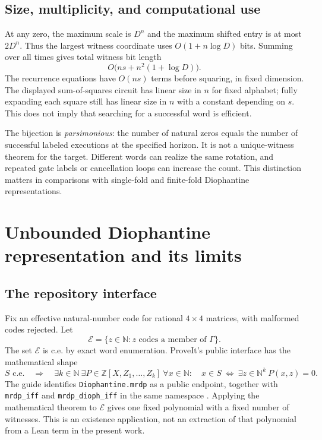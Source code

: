 \documentclass[11pt,letterpaper]{article}
\numberwithin{equation}{section}
\theoremstyle{definition}
\theoremstyle{remark}
\newcommand{\N}{\mathbb N}
\newcommand{\Z}{\mathbb Z}
\newcommand{\code}[1]{\nolinkurl{#1}}
\newcommand{\srcmark}[1]{\par\noindent{\small\itshape [source~#1]}\par}
\begin{document}
\subsection{Size, multiplicity, and computational use}
At any zero, the maximum scale is $D^n$ and the maximum shifted entry
is at most $2D^n$. Thus the largest witness coordinate uses
$O(1+n\log D)$ bits. Summing over all times gives total witness bit
length
\[
 O\bigl(ns+n^2(1+\log D)\bigr).
\]
The recurrence equations have $O(ns)$ terms before squaring, in fixed
dimension. The displayed sum-of-squares circuit has linear size in $n$
for fixed alphabet; fully expanding each square still has linear size
in $n$ with a constant depending on $s$. This does not imply that
searching for a successful word is efficient.

The bijection is \emph{parsimonious}: the number of natural zeros equals
the number of successful labeled executions at the specified horizon.
It is not a unique-witness theorem for the target. Different words can
realize the same rotation, and repeated gate labels or cancellation
loops can increase the count. This distinction matters in comparisons
with single-fold and finite-fold Diophantine representations.

\section{Unbounded Diophantine representation and its limits}
\label{pqc:dr:sec:mrdp}
\srcmark{16}

\subsection{The repository interface}
Fix an effective natural-number code for rational $4\times4$ matrices,
with malformed codes rejected. Let
\[
 \mathcal E=\{z\in\N:z\text{ codes a member of }\Gamma\}.
\]
The set $\mathcal E$ is c.e. by exact word enumeration. ProveIt's public
interface has the mathematical shape
\begin{equation}
 S\text{ c.e.}\quad\Longrightarrow\quad
 \exists k\in\N\ \exists P\in\Z[X,Z_1,\ldots,Z_k]\
 \forall x\in\N:\quad
 x\in S\ \Longleftrightarrow\ \exists z\in\N^k\ P(x,z)=0.
 \label{pqc:dr:eq:mrdp}
\end{equation}
The guide identifies \code{Diophantine.mrdp} as a public endpoint,
together with \code{mrdp_iff} and \code{mrdp_dioph_iff}
in the same namespace
\cite{b62s16-ProveItMRDP}. Applying the mathematical theorem to $\mathcal E$
gives one fixed polynomial with a fixed number of witnesses.
This is an existence application, not an extraction of that polynomial
from a Lean term in the present work.
\end{document}
